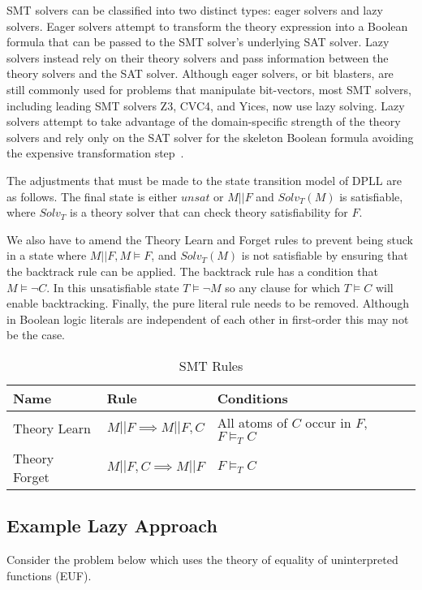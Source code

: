 \documentclass[]{final_report}
\begin{document}
SMT solvers can be classified into two distinct types: eager solvers and lazy solvers. Eager solvers attempt to transform the theory expression into a Boolean formula that can be passed to the SMT solver's underlying SAT solver. Lazy solvers instead rely on their theory solvers and pass information between the theory solvers and the SAT solver. Although eager solvers, or bit blasters, are still commonly used for problems that manipulate bit-vectors, most SMT solvers, including leading SMT solvers Z3, CVC4, and Yices, now use lazy solving.
 Lazy solvers attempt to take advantage of the domain-specific strength of the theory solvers and rely only on the SAT solver for the skeleton Boolean formula avoiding the expensive transformation step~\cite{sattosmt, smtdpplt}.

The adjustments that must be made to the state transition model of DPLL are as follows.  The final state is either $unsat$ or $M || F$ and $Solv _T(M)$ is satisfiable, where $Solv_T$ is a theory solver that can check theory satisfiability for $F$.

We also have to amend the Theory Learn and Forget rules to prevent being stuck in a state where $M || F, M \models F$, and $Solv_T(M)$ is not satisfiable by ensuring that the backtrack rule can be applied. The backtrack rule has a condition that $M \models \lnot C$. In this unsatisfiable state $T \models \lnot{M}$ so any clause for which $T \models C$ will enable backtracking. Finally, the pure literal rule needs to be removed. Although in Boolean logic literals are independent of each other in first-order this may not be the case.


\begin{table}[h]
\centering
\caption{SMT Rules}
\label{smt-rulesl}
\begin{tabular}{|l|l|l|}
\hline
Name & Rule & Conditions \\ \hline
Theory Learn & $M || F \implies M|| F, C $ & All atoms of $C$ occur in $F$, $F \models _T C $ \\ \hline
Theory Forget & $M || F, C \implies M || F $ & $F \models _T C$ \\ \hline
\end{tabular}
\end{table}

\subsection{Example Lazy Approach}
Consider the problem below which uses the theory of equality of uninterpreted functions (EUF).
\end{document}
